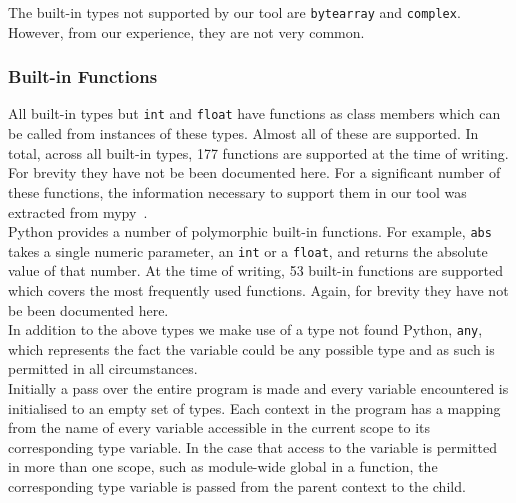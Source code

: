 \documentclass[12pt, titlepage]{article}
\begin{document}
The built-in types not supported by our tool are \texttt{bytearray} and \texttt{complex}. However, from our experience, they are not very common. \\

\subsubsection{Built-in Functions}
\indent All built-in types but \texttt{int} and \texttt{float} have functions as class members which can be called from instances of these types. Almost all of these are supported. In total, across all built-in types, 177 functions are supported at the time of writing. For brevity they have not be been documented here. For a significant number of these functions, the information necessary to support them in our tool was extracted from mypy~\cite{mypy}. \\
\indent Python provides a number of polymorphic built-in functions. For example, \texttt{abs} takes a single numeric parameter, an \texttt{int} or a \texttt{float}, and returns the absolute value of that number. At the time of writing, 53 built-in functions are supported which covers the most frequently used functions. Again, for brevity they have not be been documented here. \\
\indent In addition to the above types we make use of a type not found Python, \texttt{any}, which represents the fact the variable could be any possible type and as such is permitted in all circumstances. \\
\indent Initially a pass over the entire program is made and every variable encountered is initialised to an empty set of types. Each context in the program has a mapping from the name of every variable accessible in the current scope to its corresponding type variable. In the case that access to the variable is permitted in more than one scope, such as module-wide global in a function, the corresponding type variable is passed from the parent context to the child.
\end{document}
